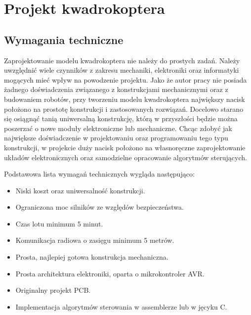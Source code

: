 
\chapter{Projekt kwadrokoptera} %

\label{Chapter5} %



\section{Wymagania techniczne}

Zaprojektowanie modelu kwadrokoptera nie należy do prostych zadań. Należy uwzględnić wiele czynników z zakresu mechaniki, elektroniki oraz informatyki mogących mieć wpływ na powodzenie projektu. Jako że autor pracy nie posiada żadnego doświadczenia związanego z konstrukcjami mechanicznymi oraz z budowaniem robotów, przy tworzeniu modelu kwadrokoptera największy nacisk położono na prostotę konstrukcji i zastosowanych rozwiązań. Docelowo starano się osiągnąć tanią uniwersalną konstrukcję, którą w przyszłości będzie można poszerzać o nowe moduły elektroniczne lub mechaniczne. Chcąc zdobyć jak największe doświadczenie w projektowaniu oraz programowaniu tego typu konstrukcji, w projekcie duży nacisk położono na własnoręczne zaprojektowanie układów elektronicznych oraz samodzielne opracowanie algorytmów sterujących.

Podstawowa lista wymagań technicznych wygląda następująco:

\begin{itemize}
	\item Niski koszt oraz uniwersalność konstrukcji.
	\item Ograniczona moc silników ze względów bezpieczeństwa.
	\item Czas lotu minimum 5 minut.
	\item Komunikacja radiowa o zasięgu minimum 5 metrów.
	\item Prosta, najlepiej gotowa konstrukcja mechaniczna.
	\item Prosta architektura elektroniki, oparta o mikrokontroler AVR.
	\item Originalny projekt PCB.
	\item Implementacja algorytmów sterowania w assemblerze lub w jęcyku C.
\end{itemize}

